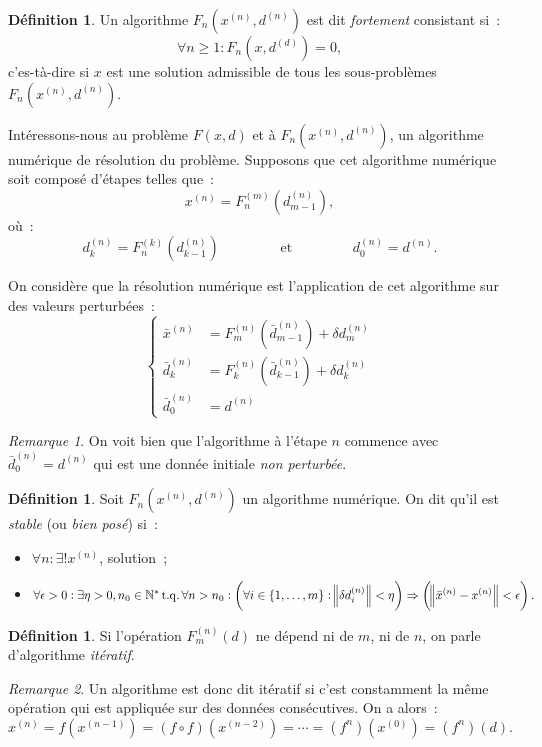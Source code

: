 \documentclass{article}
\theoremstyle{definition}
\newtheorem{déf}[thm]{Définition}
\theoremstyle{remark}
\newtheorem*{rmq}{Remarque}
\DeclareMathOperator{\tq}{t.q.}
\newcommand{\N}{\mathbb N}
\newcommand{\algonum}[3]{F_{#1}(#2^{(#1)}, #3^{(#1)})}
\newcommand{\algnum}{\algonum nxd}
\begin{document}
	\begin{déf} Un algorithme $\algnum$ est dit \emph{fortement} consistant si~:
	\[\forall n \geq 1 : F_n(x, d^{(d)}) = 0,\]
	c'es-tà-dire si $x$ est une solution admissible de tous les sous-problèmes $\algnum$.
	\end{déf}

	Intéressons-nous au problème $F(x, d)$ et à $\algnum$, un algorithme numérique de résolution du problème. Supposons que cet algorithme numérique soit composé
	d'étapes telles que~:
	\[x^{(n)} = F_n^{(m)}\left(d_{m-1}^{(n)}\right),\]
	où~:
	\[d_{k}^{(n)} = F_n^{(k)}\left(d_{k-1}^{(n)}\right)\qquad\qquad\text{ et }\qquad\qquad d_0^{(n)} = d^{(n)}.\]

	On considère que la résolution numérique est l'application de cet algorithme sur des valeurs perturbées~:
	\[\begin{cases}
		\bar x^{(n)} &= F_m^{(n)}\left(\bar d_{m-1}^{(n)}\right) + \delta d_m^{(n)} \\
		\bar d_k^{(n)} &= F_{k}^{(n)}\left(\bar d_{k-1}^{(n)}\right) + \delta d_k^{(n)} \\
		\bar d_0^{(n)} &= d^{(n)}
	\end{cases}\]

	\begin{rmq} On voit bien que l'algorithme à l'étape $n$ commence avec $\bar d_0^{(n)} = d^{(n)}$ qui est une donnée initiale \emph{non perturbée}. \end{rmq}

	\begin{déf} Soit $\algnum$ un algorithme numérique. On dit qu'il est \emph{stable} (ou \emph{bien posé}) si~:
	\begin{itemize}
		\item $\forall n : \exists! x^{(n)}$, solution~;
		\item \[\forall \epsilon > 0 : \exists \eta > 0, n_0 \in \N^* \tq \forall n > n_0 :
			\left(\forall i \in \{1, \dotsc, m\} : \norm {\delta d_i^{(n)}} < \eta\right) \Rightarrow \left(\norm {\bar x^{(n)}-x^{(n)}} < \epsilon\right).\]
	\end{itemize}
	\end{déf}

	\begin{déf} Si l'opération $F_m^{(n)}(d)$ ne dépend ni de $m$, ni de $n$, on parle d'algorithme \emph{itératif}. \end{déf}

	\begin{rmq} Un algorithme est donc dit itératif si c'est constamment la même opération qui est appliquée sur des données consécutives. On a alors~:
	\[x^{(n)} = f(x^{(n-1)}) = (f \circ f)(x^{(n-2)}) = \dotsb = \left(f^n\right)(x^{(0)}) = \left(f^n\right)(d).\]
	\end{rmq}
\end{document}
